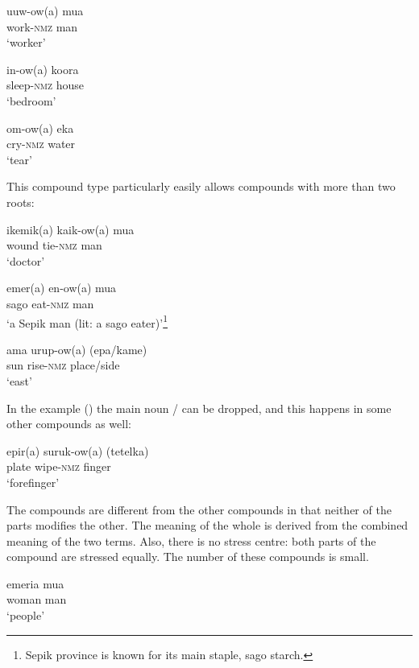 \ea%
\label{ex:x52}
\gll uuw-ow(a) mua \\
work-\textsc{nmz} man\\
\glt`worker'
\z

\ea%
\label{ex:x53}
\gll in-ow(a) koora \\
sleep-\textsc{nmz} house\\
\glt`bedroom'
\z

\ea%
\label{ex:x54}
\gll om-ow(a) eka \\
cry-\textsc{nmz} water\\
\glt`tear'
\z

This compound type particularly easily allows compounds with more than two roots: 

\ea%
\label{ex:x55}
\gll ikemik(a) kaik-ow(a) mua \\
wound tie-\textsc{nmz} man\\
\glt`doctor'
\z

\ea%
\label{ex:x56}
\gll emer(a) en-ow(a) mua \\
sago eat-\textsc{nmz} man\\
\glt`a Sepik man (lit: a sago eater)'\footnote{Sepik province is known for its main staple, sago starch.}
\z 


\ea%
\label{ex:x60}
\gll ama urup-ow(a) (epa/kame) \\
sun rise-\textsc{nmz} place/side\\
\glt`east'
\z

In the example () the main noun / can be dropped, and this happens in some other compounds as well:

\ea%
\label{ex:x61}
\gll epir(a) suruk-ow(a) (tetelka) \\
plate wipe-\textsc{nmz} finger\\
\glt`forefinger' 
\z  

The  compounds are different from the other compounds in that neither of the parts modifies the other. The meaning of the whole is derived from the combined meaning of the two terms. Also, there is no stress centre: both parts of the compound are stressed equally. The number of these compounds is small.

\ea%
\label{ex:x50}
\gll emeria mua \\
woman man\\
\glt`people'
\z

